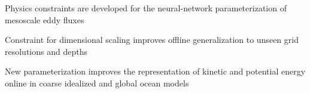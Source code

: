 \documentclass[draft]{agujournal2019}
\begin{document}
\begin{keypoints}

\item Physics constraints are developed for the neural-network parameterization of mesoscale eddy fluxes

\item Constraint for dimensional scaling  improves offline generalization to unseen grid resolutions and depths


\item New parameterization improves the representation of kinetic and potential energy online in coarse idealized and global ocean models


\end{keypoints}


%
%

%
%
\end{document}
